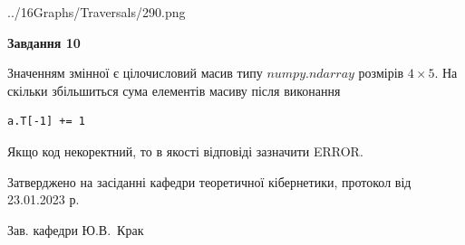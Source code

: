 \documentclass[12pt, ukrainian]{article}
\begin{document}
{\begin {large}
\begin{center}
	{../16Graphs/Traversals/290.png}
\end{center}\par
\newpage

{\begin {center}\textbf{Завдання 10}\end {center}}\par
Значенням змінної  є цілочисловий масив типу $numpy.ndarray$ розмірів $4{\times}5$. На скільки збільшиться сума елементів масиву  після виконання
\begin{verbatim}
a.T[-1] += 1
\end{verbatim}


Якщо код некоректний, то в якості відповіді зазначити ERROR.\par
\newpage


\end {large}
}
{\smallskip \begin {small} Затверджено на засіданні кафедри теоретичної кібернетики, протокол  від   23.01.2023 р.\par\smallskip\smallskip
{\parbox {6.5 cm}{Зав. кафедри \dotfill Ю.В.~Крак}} \end{small}}
\end{document}
